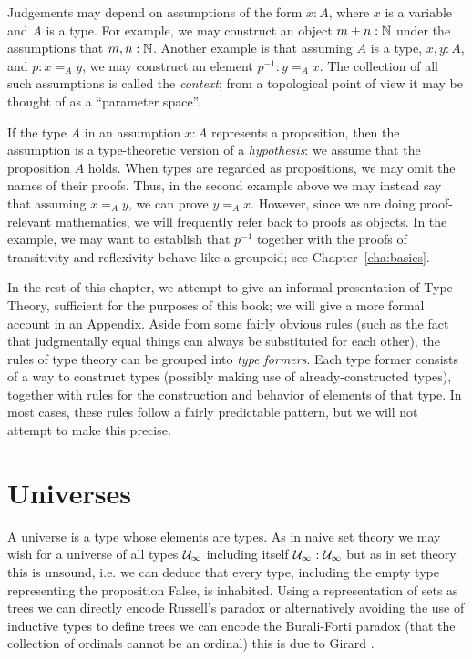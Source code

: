 Judgements may depend on assumptions of the form $x:A$, where $x$ is a variable and $A$ is a type.
For example, we may construct an object $m + n : \mathbb{N}$ under the assumptions that $m,n : \mathbb{N}$.
Another example is that assuming $A$ is a type, $x,y : A$, and $p : x =_A y$, we may construct an element $p^{-1} : y =_A x$.
The collection of all such assumptions is called the \emph{context}; from a topological point of view it may be thought of as a ``parameter space''.

If the type $A$ in an assumption $x:A$ represents a proposition, then the assumption is a type-theoretic version of a \emph{hypothesis}: we assume that the proposition $A$ holds.
When types are regarded as propositions, we may omit the names of their proofs.
Thus, in the second example above we may instead say that assuming $x =_A y$, we can prove $y =_A x$.
However, since we are doing proof-relevant mathematics, we will frequently refer back to proofs as objects.
In the example, we may want to establish that $p^{-1}$ together with the proofs of transitivity and reflexivity behave like a groupoid; see Chapter~\ref{cha:basics}.

In the rest of this chapter, we attempt to give an informal presentation of Type Theory, sufficient for the purposes of this book; we will give a more formal account in an Appendix.
Aside from some fairly obvious rules (such as the fact that judgmentally equal things can always be substituted for each other), the rules of type theory can be grouped into \emph{type formers}.
Each type former consists of a way to construct types (possibly making use of already-constructed types), together with rules for the construction and behavior of elements of that type.
In most cases, these rules follow a fairly predictable pattern, but we will not attempt to make this precise.


\section{Universes}
\label{sec:universes}

A universe is a type whose elements are types. As in naive set theory
we may wish for a universe of all types $\mathcal{U}_\infty$ including itself
$\mathcal{U}_\infty : \mathcal{U}_\infty$ but as in set
theory this is unsound, i.e. we can deduce that every type,
including the empty type representing the proposition False, is inhabited. Using a
representation of sets as trees we can directly encode Russell's
paradox \cite{thierry:trees} or alternatively avoiding the use of
inductive types to define trees we can encode the Burali-Forti paradox
(that the collection of ordinals cannot be an ordinal) this is due to
Girard \cite{girard:paradox}.

